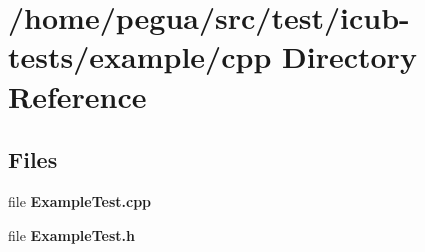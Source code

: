 \section{/home/pegua/src/test/icub-\/tests/example/cpp Directory Reference}
\label{dir_c4278cdbadca2a5e8f60a98cd2517319}
\subsection*{Files}
\begin{DoxyCompactItemize}
\item 
file {\bfseries Example\-Test.\-cpp}
\item 
file {\bfseries Example\-Test.\-h}
\end{DoxyCompactItemize}
